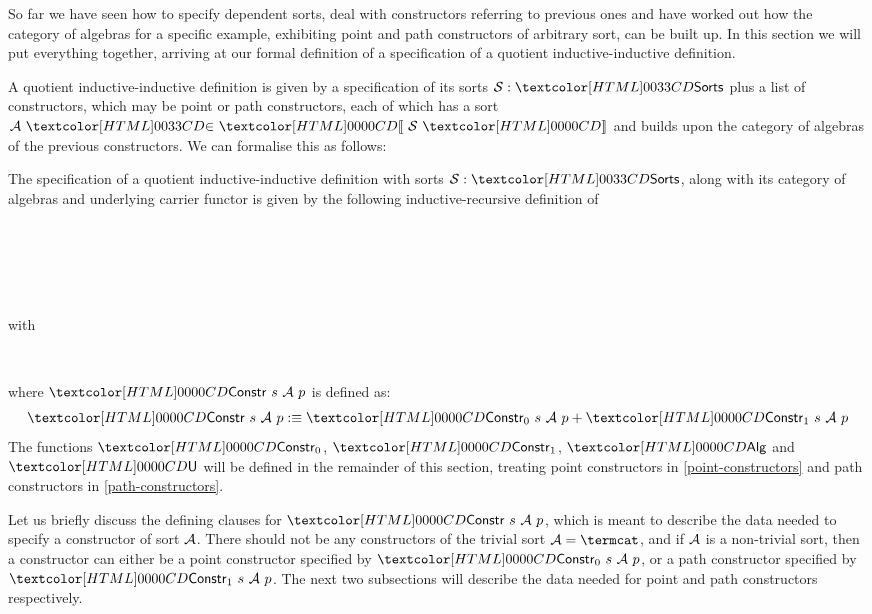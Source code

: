 So far we have seen how to specify dependent sorts, deal with
constructors referring to previous ones and have worked out how the
category of algebras for a specific example, exhibiting point and path
constructors of arbitrary sort, can be built up. In this section we
will put everything together, arriving at our formal definition of a
specification of a quotient inductive-inductive definition.

A quotient inductive-inductive definition is given by a specification
of its sorts $\Ss : \sortsty$ plus a list of constructors, which may
be point or path constructors, each of which has a sort
$\sortsin{\Aa}{\SortCat{\Ss}}$ and builds upon the category of
algebras of the previous constructors. We can formalise this as
follows:

\begin{definition}
The specification of a quotient inductive-inductive definition with
sorts $\Ss : \sortsty$, along with its category of algebras and
underlying carrier functor is given by the following
inductive-recursive definition of
\begin{sorts}
  \sortnamety{\specty}{\Set} \\
   \\
  \functy{\Alg}{\specty \to \Cat} \\
   \\
\end{sorts}
% 
with
%
\begin{datatype}{\specty}{}
  \constr{\specnil}{\specty} \\
\end{datatype}
%
where $\Constr\ s\ \Aa\ p$ is defined as:
$$
\Constr\ s\ \Aa\ p \ddefeq \Constr_0\ s\ \Aa\ p + \Constr_1\ s\ \Aa\ p
$$
%
The functions $\Constr_0$, $\Constr_1$, $\Alg$ and $\Und$ will be
defined in the remainder of this section, treating point constructors
in \cref{point-constructors} and path constructors in \cref{path-constructors}.

\end{definition}

Let us briefly discuss the defining clauses for $\Constr\ s\ \Aa\ p$,
which is meant to describe the data needed to specify a constructor of
sort $\mathcal{A}$. There should not be any constructors of the trivial sort
$\Aa = \termcat$, and if $\mathcal{A}$ is a non-trivial sort, then a
constructor can either be a point constructor specified by
$\Constr_0\ s\ \Aa\ p$, or a path constructor specified by
$\Constr_1\ s\ \Aa\ p$. The next two subsections will describe the
data needed for point and path constructors respectively.

